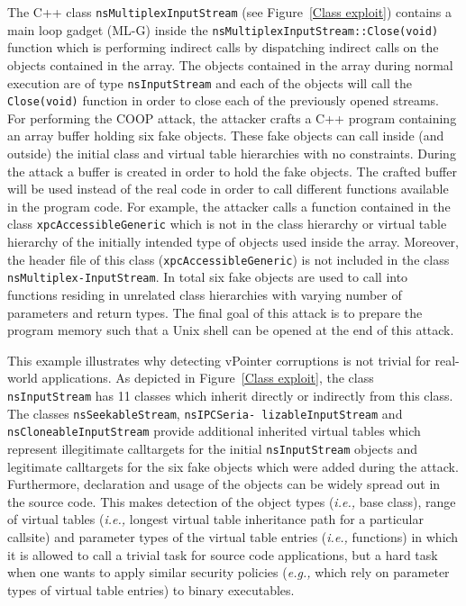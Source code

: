 The C++ class \texttt{nsMultiplexInputStream} (see Figure~\ref{Class exploit}) contains a main loop gadget (ML-G) inside the \texttt{nsMultiplexInputStream::Close(void)} 
function which is performing indirect calls by dispatching indirect calls on the objects contained in the array. The objects 
contained in the array during normal execution are of type \texttt{nsInputStream} and each of the objects will call the 
\texttt{Close(void)} function in order to close each of the previously opened streams. For performing the COOP attack, the 
attacker crafts a C++ program containing an array buffer holding six fake objects. These fake objects can call inside (and outside) 
the initial class and virtual table hierarchies with no constraints. During the attack a buffer is created in order to hold the 
fake objects.
The crafted buffer will be used instead of the real code in order to call different functions available in the program code. 
For example, the attacker calls a function contained in the class \texttt{xpcAccessibleGeneric} which is not in the class 
hierarchy or virtual table hierarchy of the initially intended type of objects used inside the array. Moreover, the header 
file of this class (\texttt{xpcAccessibleGeneric}) is not included in the class \texttt{nsMultiplex-InputStream}. In total 
six fake objects are used to call into functions residing in unrelated class hierarchies with varying number of parameters 
and return types. The final goal of this attack is to prepare the program memory such that a Unix shell can be opened at 
the end of this attack.

This example illustrates why detecting vPointer corruptions is not trivial for real-world applications. As depicted in 
Figure~\ref{Class exploit}, the class \texttt{nsInputStream} has 11 classes which inherit directly or indirectly from 
this class. The classes \texttt{nsSeekableStream}, \texttt{nsIPCSeria- lizableInputStream} and \texttt{nsCloneableInputStream}
provide additional inherited virtual tables which represent illegitimate calltargets for the initial \texttt{nsInputStream} 
objects and legitimate calltargets for the six fake objects which were added during the attack. Furthermore, declaration and
usage of the objects can be widely spread out in the source code. This makes detection of the object types 
(\textit{i.e.,} base class), range of virtual tables (\textit{i.e.,} longest virtual table inheritance path for a
particular callsite) and parameter types of the virtual table entries (\textit{i.e.,} functions) in which it is 
allowed to call a trivial task for source code applications, but a hard task when one wants to apply similar 
security policies (\textit{e.g.,} which rely on parameter types of virtual table entries) to binary executables.

